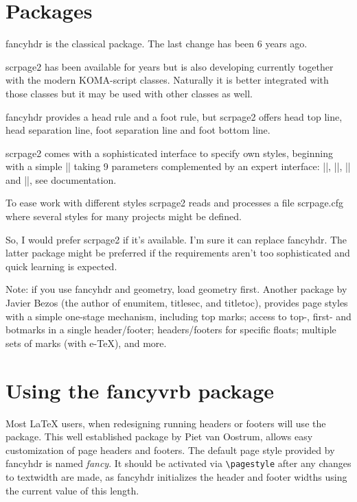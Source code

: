 \section{Packages}
fancyhdr is the classical package. The last change has been 6 years ago.

scrpage2 has been available for years but is also developing currently together with the modern KOMA-script classes. Naturally it is better integrated with those classes but it may be used with other classes as well.

fancyhdr provides a head rule and a foot rule, but scrpage2 offers head top line, head separation line, foot separation line and foot bottom line.

scrpage2 comes with a sophisticated interface to specify own styles, beginning with a simple || taking 9 parameters complemented by an expert interface: ||, |\newpagestyle|, |\renewpagestyle| and |\providepagestyle|, see documentation.

To ease work with different styles scrpage2 reads and processes a file scrpage.cfg where several styles for many projects might be defined.

So, I would prefer scrpage2 if it's available. I'm sure it can replace fancyhdr. The latter package might be preferred if the requirements aren't too sophisticated and quick learning is expected.

Note: if you use fancyhdr and geometry, load geometry first.
Another package  by Javier Bezos (the author of enumitem, titlesec, and titletoc), provides page styles with a simple one-stage mechanism, including top marks; access to top-, first- and botmarks in a single header/footer; headers/footers for specific floats; multiple sets of marks (with e-TeX), and more.

\section{Using the fancyvrb package}

Most LaTeX users, when redesigning running headers or footers will use the  package. This well established package by Piet van Oostrum, allows easy customization of page headers and footers. The default page style provided by fancyhdr is named \textit{fancy}.  It should be activated via
\lstinline{\pagestyle} after any changes to textwidth are made, as fancyhdr initializes
the header and footer widths using the current value of this length.

